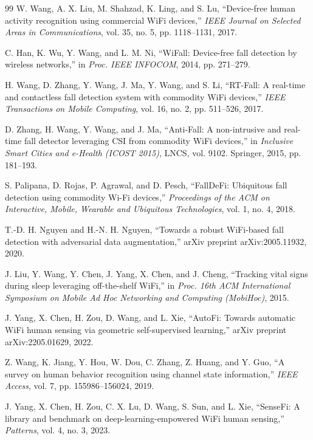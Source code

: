 \documentclass[12pt,a4paper]{report}
\begin{document}
\begin{thebibliography}{99}
 W. Wang, A. X. Liu, M. Shahzad, K. Ling, and S. Lu, ``Device-free human activity recognition using commercial WiFi devices,'' \emph{IEEE Journal on Selected Areas in Communications}, vol. 35, no. 5, pp. 1118--1131, 2017.

 C. Han, K. Wu, Y. Wang, and L. M. Ni, ``WiFall: Device-free fall detection by wireless networks,'' in \emph{Proc. IEEE INFOCOM}, 2014, pp. 271--279.

 H. Wang, D. Zhang, Y. Wang, J. Ma, Y. Wang, and S. Li, ``RT-Fall: A real-time and contactless fall detection system with commodity WiFi devices,'' \emph{IEEE Transactions on Mobile Computing}, vol. 16, no. 2, pp. 511--526, 2017.

 D. Zhang, H. Wang, Y. Wang, and J. Ma, ``Anti-Fall: A non-intrusive and real-time fall detector leveraging CSI from commodity WiFi devices,'' in \emph{Inclusive Smart Cities and e-Health (ICOST 2015)}, LNCS, vol. 9102. Springer, 2015, pp. 181--193.

 S. Palipana, D. Rojas, P. Agrawal, and D. Pesch, ``FallDeFi: Ubiquitous fall detection using commodity Wi-Fi devices,'' \emph{Proceedings of the ACM on Interactive, Mobile, Wearable and Ubiquitous Technologies}, vol. 1, no. 4, 2018.

 T.-D. H. Nguyen and H.-N. H. Nguyen, ``Towards a robust WiFi-based fall detection with adversarial data augmentation,'' arXiv preprint arXiv:2005.11932, 2020.

 J. Liu, Y. Wang, Y. Chen, J. Yang, X. Chen, and J. Cheng, ``Tracking vital signs during sleep leveraging off-the-shelf WiFi,'' in \emph{Proc. 16th ACM International Symposium on Mobile Ad Hoc Networking and Computing (MobiHoc)}, 2015.

 J. Yang, X. Chen, H. Zou, D. Wang, and L. Xie, ``AutoFi: Towards automatic WiFi human sensing via geometric self-supervised learning,'' arXiv preprint arXiv:2205.01629, 2022.

 Z. Wang, K. Jiang, Y. Hou, W. Dou, C. Zhang, Z. Huang, and Y. Guo, ``A survey on human behavior recognition using channel state information,'' \emph{IEEE Access}, vol. 7, pp. 155986--156024, 2019.

 J. Yang, X. Chen, H. Zou, C. X. Lu, D. Wang, S. Sun, and L. Xie, ``SenseFi: A library and benchmark on deep-learning-empowered WiFi human sensing,'' \emph{Patterns}, vol. 4, no. 3, 2023.

\end{thebibliography}
\end{document}
